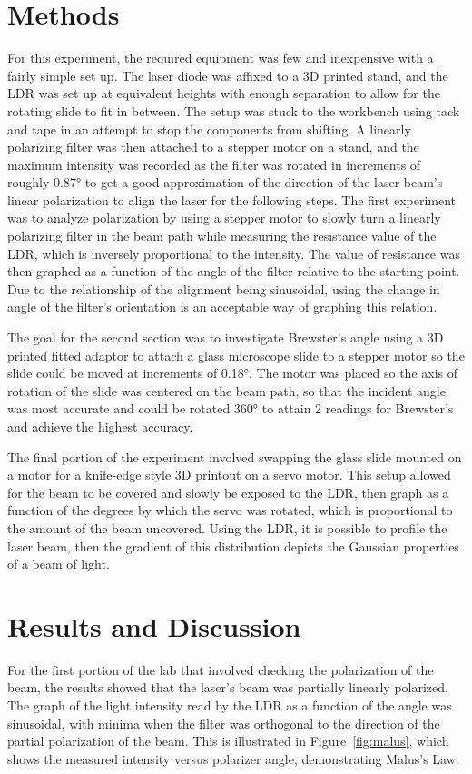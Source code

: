 \documentclass[12pt,a4paper]{article}
\begin{document}
\section{Methods}
For this experiment, the required equipment was few and inexpensive with a fairly simple set up. The laser diode was affixed to a 3D printed stand, and the LDR was set up at equivalent heights with enough separation to allow for the rotating slide to fit in between. The setup was stuck to the workbench using tack and tape in an attempt to stop the components from shifting. A linearly polarizing filter was then attached to a stepper motor on a stand, and the maximum intensity was recorded as the filter was rotated in increments of roughly 0.87° to get a good approximation of the direction of the laser beam's linear polarization to align the laser for the following steps. The first experiment was to analyze polarization by using a stepper motor to slowly turn a linearly polarizing filter in the beam path while measuring the resistance value of the LDR, which is inversely proportional to the intensity. The value of resistance was then graphed as a function of the angle of the filter relative to the starting point. Due to the relationship of the alignment being sinusoidal, using the change in angle of the filter's orientation is an acceptable way of graphing this relation.

The goal for the second section was to investigate Brewster's angle using a 3D printed fitted adaptor to attach a glass microscope slide to a stepper motor so the slide could be moved at increments of 0.18°. The motor was placed so the axis of rotation of the slide was centered on the beam path, so that the incident angle was most accurate and could be rotated 360° to attain 2 readings for Brewster's and achieve the highest accuracy.

The final portion of the experiment involved swapping the glass slide mounted on a motor for a knife-edge style 3D printout on a servo motor. This setup allowed for the beam to be covered and slowly be exposed to the LDR, then graph as a function of the degrees by which the servo was rotated, which is proportional to the amount of the beam uncovered. Using the LDR, it is possible to profile the laser beam, then the gradient of this distribution depicts the Gaussian properties of a beam of light.

\section{Results and Discussion}
For the first portion of the lab that involved checking the polarization of the beam, the results showed that the laser's beam was partially linearly polarized. The graph of the light intensity read by the LDR as a function of the angle was sinusoidal, with minima when the filter was orthogonal to the direction of the partial polarization of the beam. This is illustrated in Figure~\ref{fig:malus}, which shows the measured intensity versus polarizer angle, demonstrating Malus's Law.
\end{document}

